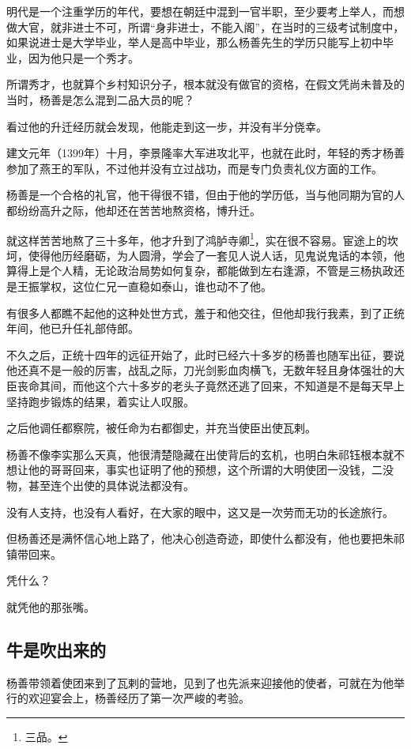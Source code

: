 \begin{multicols}{\theparacolNo}
明代是一个注重学历的年代，要想在朝廷中混到一官半职，至少要考上举人，而想做大官，就非进士不可，所谓“身非进士，不能入阁”，在当时的三级考试制度中，如果说进士是大学毕业，举人是高中毕业，那么杨善先生的学历只能写上初中毕业，因为他只是一个秀才。

所谓秀才，也就算个乡村知识分子，根本就没有做官的资格，在假文凭尚未普及的当时，杨善是怎么混到二品大员的呢？

看过他的升迁经历就会发现，他能走到这一步，并没有半分侥幸。

建文元年（1399年）十月，李景隆率大军进攻北平，也就在此时，年轻的秀才杨善参加了燕王的军队，不过他并没有立过战功，而是专门负责礼仪方面的工作。

杨善是一个合格的礼官，他干得很不错，但由于他的学历低，当与他同期为官的人都纷纷高升之际，他却还在苦苦地熬资格，博升迁。

就这样苦苦地熬了三十多年，他才升到了鸿胪寺卿\footnote{三品。}，实在很不容易。宦途上的坎坷，使得他历经磨砺，为人圆滑，学会了一套见人说人话，见鬼说鬼话的本领，他算得上是个人精，无论政治局势如何复杂，都能做到左右逢源，不管是三杨执政还是王振掌权，这位仁兄一直稳如泰山，谁也动不了他。

有很多人都瞧不起他的这种处世方式，羞于和他交往，但他却我行我素，到了正统年间，他已升任礼部侍郎。

不久之后，正统十四年的远征开始了，此时已经六十多岁的杨善也随军出征，要说他还真不是一般的厉害，战乱之际，刀光剑影血肉横飞，无数年轻且身体强壮的大臣丧命其间，而他这个六十多岁的老头子竟然还逃了回来，不知道是不是每天早上坚持跑步锻炼的结果，着实让人叹服。

之后他调任都察院，被任命为右都御史，并充当使臣出使瓦剌。

杨善不像李实那么天真，他很清楚隐藏在出使背后的玄机，也明白朱祁钰根本就不想让他的哥哥回来，事实也证明了他的预想，这个所谓的大明使团一没钱，二没物，甚至连个出使的具体说法都没有。

没有人支持，也没有人看好，在大家的眼中，这又是一次劳而无功的长途旅行。

但杨善还是满怀信心地上路了，他决心创造奇迹，即使什么都没有，他也要把朱祁镇带回来。

凭什么？

就凭他的那张嘴。

\subsection{牛是吹出来的}
杨善带领着使团来到了瓦剌的营地，见到了也先派来迎接他的使者，可就在为他举行的欢迎宴会上，杨善经历了第一次严峻的考验。


\end{multicols}
